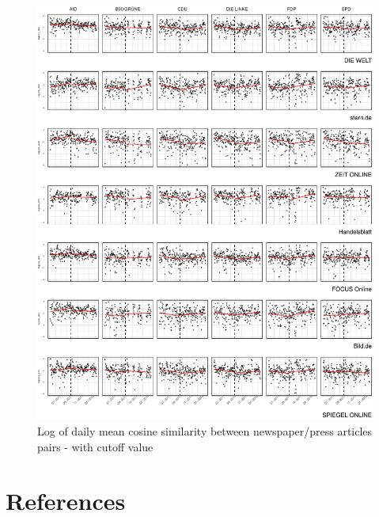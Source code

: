 \documentclass[
  12pt,
]{article}
\begin{document}
\begin{figure}

{\centering \includegraphics[width=1\linewidth]{main_text_files/figure-latex/Daily mean cosine similarity - cutoff value-1} 

}

\caption{Log of daily mean cosine similarity between newspaper/press articles pairs - with cutoff value \label{fig:mean_cosine_sim_rd}}\label{fig:Daily mean cosine similarity - cutoff value}
\end{figure}

\newpage

\hypertarget{references}{%
\section*{References}\label{references}}
\end{document}
